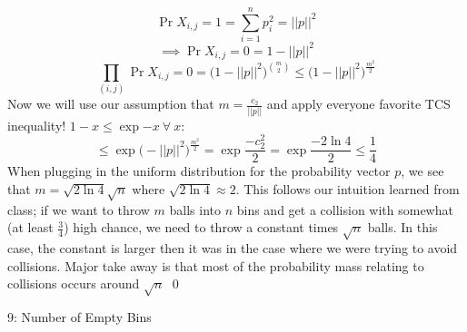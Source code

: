 \documentclass[12pt]{article}
\begin{document}
\begin{solution}
\begin{enumerate}[label=(\alph*)]
    \[
    \Pr{X_{i,j}=1} = \sum_{i=1}^n{p_i^2} = ||p||^2
    \]
    \[
    \implies \Pr{X_{i,j}=0} = 1 - ||p||^2
    \]
    \[
    \prod_{(i,j)}{\Pr{X_{i,j}=0}} = \big(1 - ||p||^2\big)^{\binom{m}{2}} \leq \big(1 - ||p||^2\big)^{
    \frac{m^2}{2}}
    \]
    Now we will use our assumption that $m = \frac{c_2}{||p||}$ and  apply everyone favorite TCS inequality! $1 - x \leq \exp{-x} ~\forall~x$:
    \[
    \leq \exp{\big(-||p||^{2}\big)^{
    \frac{m^2}{2}}} = \exp{\frac{-c_{2}^{2}}{2}} = \exp{\frac{-2\ln{4}}{2}} \leq \frac{1}{4}
    \]
    When plugging in the uniform distribution for the probability vector $p$, we see that $m = \sqrt{2\ln{4}} \sqrt{n}$ where $\sqrt{2\ln{4}} \approx 2$. This follows our intuition learned from class; if we want to throw $m$ balls into $n$ bins and get a collision with somewhat (at least $\frac{3}{4}$) high chance, we need to throw a constant times $\sqrt{n}$ balls. In this case, the constant is larger then it was in the case where we were trying to avoid collisions. Major take away is that most of the probability mass relating to collisions occurs around $\sqrt{n}$ \qed
    
\end{enumerate}
\end{solution}

\begin{problem}{9: Number of Empty Bins}
\end{problem}
\end{document}
